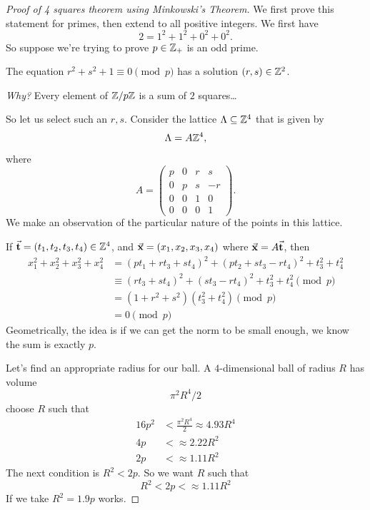 \begin{proof}[Proof of 4 squares theorem using Minkowski's Theorem]
    We first prove this statement for primes, then extend to all positive integers. We first have
    \[2 = 1^2 + 1^2 + 0^2 + 0^2.\]
    So suppose we're trying to prove $p\in\mathbb Z_+$ is an odd prime.
    \begin{claim*}
        The equation $r^2 + s^2 + 1\equiv 0\pmod{p}$ has a solution $(r, s)\in\mathbb Z^2$.
    \end{claim*}
    \emph{Why?} Every element of $\mathbb Z/p\mathbb Z$ is a sum of $2$ squares\dots

    So let us select such an $r, s$. Consider the lattice $\Lambda\subseteq\mathbb Z^4$ that is given by
    \[\Lambda = A\mathbb Z^4,\]
    where
    \[A = \begin{pmatrix}
            p & 0 & r & s  \\
            0 & p & s & -r \\
            0 & 0 & 1 & 0  \\
            0 & 0 & 0 & 1
        \end{pmatrix}.\]
    We make an observation of the particular nature of the points in this lattice.

    If $\vec{\mathbf{t}}= (t_1, t_2, t_3, t_4)\in\mathbb Z^4$, and $\vec{\mathbf{x}} = (x_1, x_2, x_3, x_4)$ where $\vec{\mathbf{x}} = A\vec{\mathbf{t}}$, then
    \begin{align*}
        x_1^2 + x_2^2 + x_3^2 + x_4^2
         & = (pt_1 + rt_3 + st_4)^2 + (pt_2 + st_3 - rt_4)^2 + t_3^2 + t_4^2 \\
         & \equiv (rt_3 + st_4)^2 + (st_3 - rt_4)^2 + t_3^2 + t_4^2\pmod{p}  \\
         & = (1 + r^2 + s^2)(t_3^2 + t_4^2)\pmod{p}                          \\
         & = 0\pmod{p}
    \end{align*}
    Geometrically, the idea is if we can get the norm to be small enough, we know the sum is exactly $p$.

    Let's find an appropriate radius for our ball. A $4$-dimensional ball of radius $R$ has volume
    \[\pi^2R^4/2\]
    choose $R$ such that
    \begin{align*}
        16p^2 & < \frac{\pi^2 R^4}{2}\approx 4.93 R^4 \\
        4p    & < \approx 2.22 R^2                    \\
        2p    & < \approx 1.11 R^2
    \end{align*}
    The next condition is $R^2 < 2p$. So we want $R$ such that
    \[R^2 < 2p < \approx 1.11 R^2\]
    If we take $R^2 = 1.9p$ works.


\end{proof}
